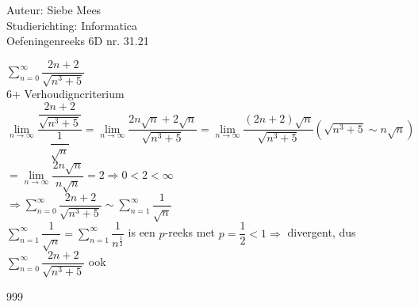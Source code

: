 \documentclass[a4paper]{article}
\begin{document}
  
\noindent \large Auteur: Siebe Mees \\
\noindent \large Studierichting: Informatica\\
\noindent \large Oefeningenreeks 6D nr. 31.21\\

\medskip

\normalsize

$ \displaystyle\sum_{n=0}^{\infty} \dfrac{2n+2}{\sqrt{n^3+5}} $\\

6+ Verhoudigncriterium \\

$ \lim\limits_{n \rightarrow \infty} \dfrac{\dfrac{2n+2}{\sqrt{n^3+5}}}{\dfrac{1}{\sqrt{n}}} = \lim\limits_{n \rightarrow \infty} \dfrac{2n\sqrt{n}+2\sqrt{n}}{\sqrt{n^3+5}} = \lim\limits_{n \rightarrow \infty} \dfrac{(2n+2)\sqrt{n}}{\sqrt{n^3+5}} \left(\sqrt{n^3+5} \sim n\sqrt{n} \right)$\\

$ = \lim\limits_{n \rightarrow \infty} \dfrac{2n\sqrt{n}}{n\sqrt{n}} = 2 \Rightarrow 0 < 2 < \infty $\\

$\Rightarrow \displaystyle\sum_{n=0}^{\infty} \dfrac{2n+2}{\sqrt{n^3+5}} \sim \displaystyle\sum_{n=1}^{\infty} \dfrac{1}{\sqrt{n}} $\\

$ \displaystyle\sum_{n=1}^{\infty} \dfrac{1}{\sqrt{n}} = \displaystyle\sum_{n=1}^{\infty} \dfrac{1}{n^{\tfrac{1}{2}}} $ is een $ p $-reeks met $ p=\dfrac{1}{2}<1 \Rightarrow $ divergent, dus $\displaystyle\sum_{n=0}^{\infty} \dfrac{2n+2}{\sqrt{n^3+5}} $ ook\\

\begin{thebibliography}{999}
\end{thebibliography}
\end{document}
